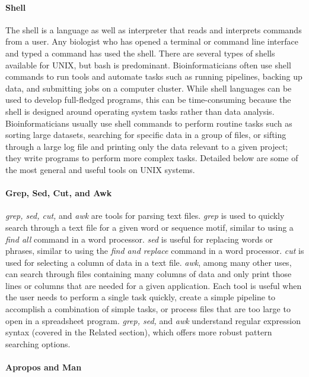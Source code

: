 \documentclass[ChapterTOCs,krantz2]{krantz} %
\newcommand{\unix}{UNIX}
\begin{document}
\paragraph{Shell}

The shell is a language as well as interpreter that reads and interprets commands
from a user. Any biologist who has opened a terminal or command line interface
and typed a command has used the shell. There are several types of shells available 
for \unix{}, but bash is predominant. 
Bioinformaticians often use shell commands to
run tools and automate tasks such as running pipelines, backing up
data, and submitting jobs on a computer cluster. While shell languages can be
used to develop full-fledged programs, this can be time-consuming 
because the shell is designed around operating system tasks rather than
data analysis.
Bioinformaticians usually use shell commands to perform routine tasks such as
sorting large datasets,
searching for specific data in a group of files, or sifting through a large log
file and printing only the data relevant to a given project; they write programs to perform 
more complex tasks.  Detailed below are
some of the most general and useful tools on
\unix{} systems.

\paragraph{Grep, Sed, Cut, and Awk}

\emph{grep, sed, cut,} and \emph{awk} are tools for parsing text files.
\emph{grep} is used to
quickly search through a text file for a given word or sequence
motif, similar to using a \emph{find all} command in a word processor.  \emph{sed} is
useful for replacing words or phrases,
similar to using the \emph{find and replace} command in a word processor.
\emph{cut} is
used for selecting a column of data in a text file.  \emph{awk}, among many other uses, 
can search through files containing many columns of data and only print
those lines or columns that are needed for a given application.  
Each tool is useful when the user needs to
perform a single task quickly, create a simple pipeline to accomplish a
combination of simple tasks, or process files that are too large to open in a
spreadsheet program.  \emph{grep, sed,} and \emph{awk} understand regular expression
syntax (covered in the Related section), which offers more robust pattern searching options.  

\paragraph{Apropos and Man}
\end{document}
